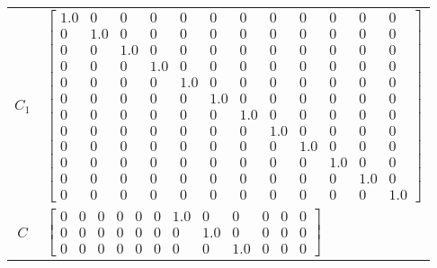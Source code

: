 \begin{tabular}{cl}
 $C_{1}$  & $\left[\begin{array}{cccccccccccc}1.0 & 0 & 0 & 0 & 0 & 0 & 0 & 0 & 0 & 0 & 0 & 0\\0 & 1.0 & 0 & 0 & 0 & 0 & 0 & 0 & 0 & 0 & 0 & 0\\0 & 0 & 1.0 & 0 & 0 & 0 & 0 & 0 & 0 & 0 & 0 & 0\\0 & 0 & 0 & 1.0 & 0 & 0 & 0 & 0 & 0 & 0 & 0 & 0\\0 & 0 & 0 & 0 & 1.0 & 0 & 0 & 0 & 0 & 0 & 0 & 0\\0 & 0 & 0 & 0 & 0 & 1.0 & 0 & 0 & 0 & 0 & 0 & 0\\0 & 0 & 0 & 0 & 0 & 0 & 1.0 & 0 & 0 & 0 & 0 & 0\\0 & 0 & 0 & 0 & 0 & 0 & 0 & 1.0 & 0 & 0 & 0 & 0\\0 & 0 & 0 & 0 & 0 & 0 & 0 & 0 & 1.0 & 0 & 0 & 0\\0 & 0 & 0 & 0 & 0 & 0 & 0 & 0 & 0 & 1.0 & 0 & 0\\0 & 0 & 0 & 0 & 0 & 0 & 0 & 0 & 0 & 0 & 1.0 & 0\\0 & 0 & 0 & 0 & 0 & 0 & 0 & 0 & 0 & 0 & 0 & 1.0\end{array}\right]$                                                                                                                         \\
   $C$    & $\left[\begin{array}{cccccccccccc}0 & 0 & 0 & 0 & 0 & 0 & 1.0 & 0 & 0 & 0 & 0 & 0\\0 & 0 & 0 & 0 & 0 & 0 & 0 & 1.0 & 0 & 0 & 0 & 0\\0 & 0 & 0 & 0 & 0 & 0 & 0 & 0 & 1.0 & 0 & 0 & 0\end{array}\right]$                                                                                                                                                                                                                                                                                                                                                                                                                                                                                                                                                                                  \\

\end{tabular}
